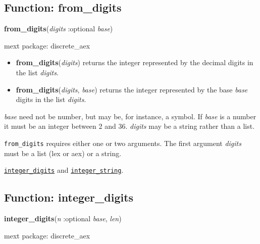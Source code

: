 \documentclass[]{article}
\begin{document}
\vspace{5 pt}


\subsection{Function: from\_digits\label{sec:from_digits}}
\hypertarget{from_digits}{}
{\bf from\_digits}({\it digits} :optional {\it base})


\noindent mext package: discrete\_aex



\vspace{5 pt}
\begin{itemize}
\item[] {\bf from\_digits}({\it digits})
  returns the integer represented by the decimal digits in the list {\it digits}. 

\item[] {\bf from\_digits}({\it digits}, {\it base})
  returns the integer represented by the base {\it base} digits in the list {\it digits}. 

\end{itemize}
{\it base} need not be number, but may be, for instance, a symbol. If {\it base} is a number it must be an integer between 2 and 36. {\it digits} may be a string rather than a list. 

\vspace{5 pt}

   {\tt from\_digits} requires either one or two arguments.
    The first argument {\it digits} must be a list (lex or aex) or a string.


\vspace{5 pt}


 \hyperlink{integer_digits}{{\tt integer\_digits}} and \hyperlink{integer_string}{{\tt integer\_string}}.

\vspace{5 pt}


\subsection{Function: integer\_digits\label{sec:integer_digits}}
\hypertarget{integer_digits}{}
{\bf integer\_digits}({\it n} :optional {\it base}, {\it len})


\noindent mext package: discrete\_aex
\end{document}
